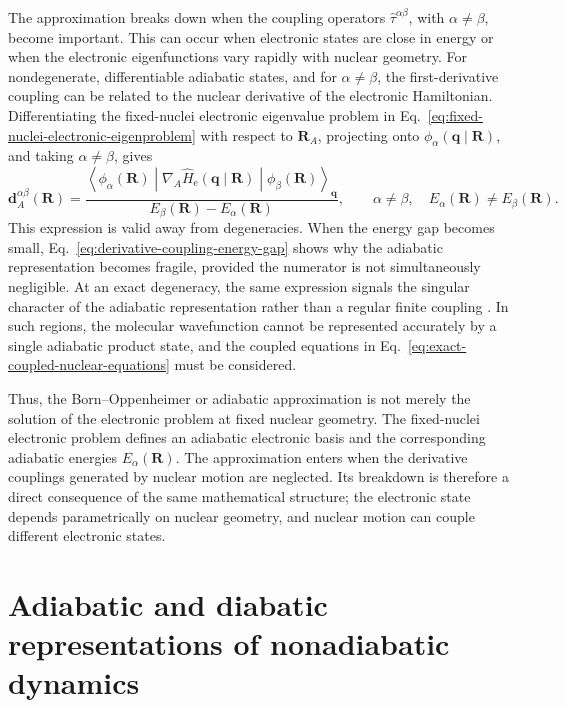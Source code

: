 \documentclass[
  11pt,
  letterpaper,
  onehalfspacing,
  normalmargins,
  equalmargins,
  oneside
]{ut-thesis}
\begin{document}
The approximation breaks down when the coupling operators
\(\hat\tau^{\alpha\beta}\), with \(\alpha\neq\beta\), become important. This
can occur when electronic states are close in energy or when the electronic
eigenfunctions vary rapidly with nuclear geometry. For nondegenerate,
differentiable adiabatic states, and for \(\alpha\neq\beta\), the
first-derivative coupling can be related to the nuclear derivative of the
electronic Hamiltonian. Differentiating the fixed-nuclei electronic eigenvalue
problem in Eq.~\eqref{eq:fixed-nuclei-electronic-eigenproblem} with respect to
\(\mathbf R_A\), projecting onto \(\phi_\alpha(\mathbf q\mid\mathbf R)\), and
taking \(\alpha\neq\beta\), gives
\begin{equation}
\mathbf d_A^{\alpha\beta}(\mathbf R)
=
\frac{
\left\langle
\phi_\alpha(\mathbf R)
\middle|
\nabla_A \hat H_{\mathrm e}(\mathbf q\mid\mathbf R)
\middle|
\phi_\beta(\mathbf R)
\right\rangle_{\mathbf q}
}{
E_\beta(\mathbf R)-E_\alpha(\mathbf R)
},
\qquad
\alpha\neq\beta,\quad E_\alpha(\mathbf R)\neq E_\beta(\mathbf R).
\label{eq:derivative-coupling-energy-gap}
\end{equation}
This expression is valid away from degeneracies. When the energy gap becomes
small, Eq.~\eqref{eq:derivative-coupling-energy-gap} shows why the adiabatic
representation becomes fragile, provided the numerator is not simultaneously
negligible. At an exact degeneracy, the same expression signals the singular
character of the adiabatic representation rather than a regular finite
coupling \cite{Yarkony1996RMP,DomckeYarkonyKoppel2004,Baer2006Book}. In such
regions, the molecular wavefunction cannot be represented accurately by a
single adiabatic product state, and the coupled equations in
Eq.~\eqref{eq:exact-coupled-nuclear-equations} must be considered.

Thus, the Born--Oppenheimer or adiabatic approximation is not merely the
solution of the electronic problem at fixed nuclear geometry. The fixed-nuclei
electronic problem defines an adiabatic electronic basis and the corresponding
adiabatic energies \(E_\alpha(\mathbf R)\). The approximation enters when the
derivative couplings generated by nuclear motion are neglected. Its breakdown
is therefore a direct consequence of the same mathematical structure; the
electronic state depends parametrically on nuclear geometry, and nuclear
motion can couple different electronic states.


\section{Adiabatic and diabatic representations of nonadiabatic dynamics}
\label{sec:adiabatic-diabatic-representations}
\end{document}
